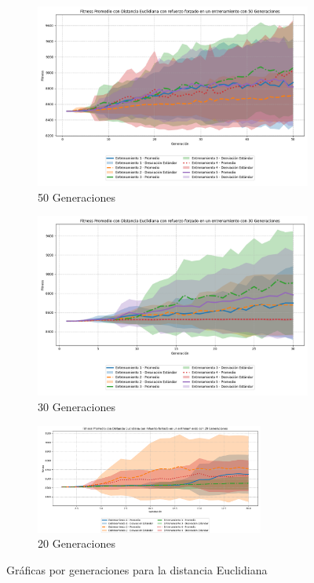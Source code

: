 \documentclass[conference]{IEEEtran}
\begin{document}
\begin{figure}[ht]
    \centering


    \begin{subfigure}{0.3\textwidth}
        \centering
        \includegraphics[width=\textwidth]{Euclidiana/Fitness_Acumulado_Eucli_50Gen.png}
        \caption{50 Generaciones}
        \label{fig:eucli_50gen}
    \end{subfigure}
    \hfill
    \begin{subfigure}{0.3\textwidth}
        \centering
        \includegraphics[width=\textwidth]{Euclidiana/Fitness_Acumulado_Eucli_30Gen.png}
        \caption{30 Generaciones}
        \label{fig:eucli_30gen}
    \end{subfigure}
    \hfill
    \begin{subfigure}{0.3\textwidth}
        \centering
        \includegraphics[width=\textwidth, height=3.6cm]{Euclidiana/Fitness_Acumulado_Eucli_20Gen.png}
        \caption{20 Generaciones}
        \label{fig:eucli_20gen}
    \end{subfigure}
	\caption{Gráficas por generaciones para la distancia Euclidiana}
    \label{fig:graficas_generales_euclidiana}
\end{figure}
\end{document}
